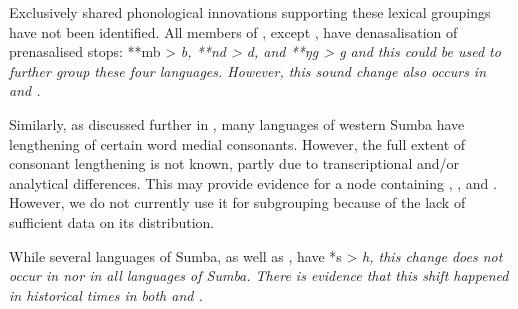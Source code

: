 Exclusively shared phonological innovations supporting these
lexical groupings have not been identified.
All members of ,
except , have denasalisation of prenasalised stops: **mb
> \it{b}, **nd > \it{d}, and **ŋg > \it{g}
and this could be used to further group these four languages.
However, this sound change also occurs in  and .

Similarly, as discussed further in ,
many languages of western Sumba
have lengthening of certain word medial consonants.
However, the full extent of consonant lengthening is not known,
partly due to transcriptional and/or analytical differences.
This may provide evidence for a node containing , , and .
However, we do not currently use it for subgrouping because of
the lack of sufficient data on its distribution.

While several languages of Sumba,
as well as , have *s > \it{h},
this change does not occur in  nor in all languages of Sumba.
There is evidence that this shift happened in historical
times in both  \citep[12]{Klamer1998a} and  \citep[3]{WalkerA1982}.
